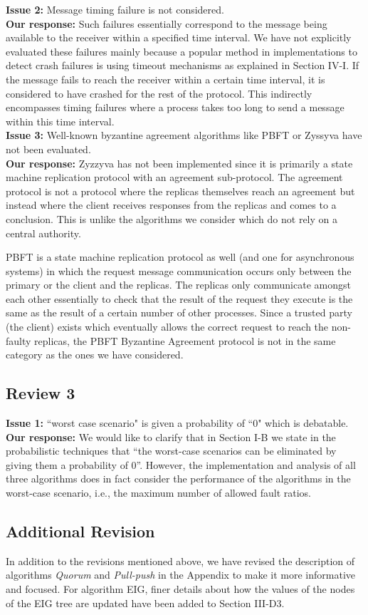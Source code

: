 \documentclass[a4paper]{article}
\begin{document}
\noindent \textbf{Issue 2:} Message timing failure is not considered.\\
\textbf{Our response:} Such failures essentially correspond to the message being available to the receiver within a specified time interval. We have not explicitly evaluated these failures mainly because a popular method in implementations to detect crash failures is using timeout mechanisms as explained in Section IV-I. If the message fails to reach the receiver within a certain time interval, it is considered to have crashed for the rest of the protocol. This indirectly encompasses timing failures where a process takes too long to send a message within this time interval. \\

\noindent \textbf{Issue 3:} Well-known byzantine agreement algorithms like PBFT or Zyssyva have not been evaluated. \\
\textbf{Our response:} Zyzzyva has not been implemented since it is primarily a state machine replication protocol with an agreement sub-protocol. The agreement protocol is not a protocol where the replicas themselves reach an agreement but instead where the client receives responses from the replicas and comes to a conclusion. This is unlike the algorithms we consider which do not rely on a central authority.

PBFT is a state machine replication protocol as well (and one for asynchronous systems) in which the request message communication occurs only between the primary or the client and the replicas. The replicas only communicate amongst each other essentially to check that the result of the request they execute is the same as the result of a certain number of other processes. Since a trusted party (the client) exists which eventually allows the correct request to reach the non-faulty replicas, the PBFT Byzantine Agreement protocol is not in the same category as the ones we have considered.

\subsection{Review 3}
\textbf{Issue 1:} ``worst case scenario" is given a probability of ``0" which is debatable. \\
\textbf{Our response:} We would like to clarify that in Section I-B we state in the probabilistic techniques that ``the worst-case scenarios can be eliminated by
giving them a probability of 0''. However, the implementation and analysis of all three algorithms does in fact consider the performance of the algorithms in the worst-case scenario, i.e., the maximum number of allowed fault ratios.

\subsection{Additional Revision}
In addition to the revisions mentioned above, we have revised the description of algorithms \textit{Quorum} and \textit{Pull-push} in the Appendix to make it more informative and focused. For algorithm {EIG}, finer details about how the values of the nodes of the EIG tree are updated have been added to Section III-D3.
 
\end{document}
